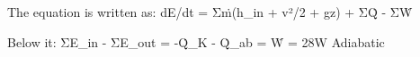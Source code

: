 The equation is written as:  
dE/dt = Σṁ(h_in + v²/2 + gz) + ΣQ̇ - ΣẆ  

Below it:  
ΣE_in - ΣE_out = -Q̇_K - Q̇_ab = Ẇ = 28W  
Adiabatic